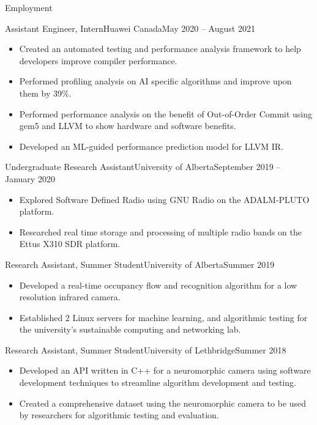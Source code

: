 \documentclass[]{mcdowellcv}
\begin{document}
\begin{cvsection}{Employment}
   \begin{cvsubsection}{Assistant Engineer, Intern}{Huawei Canada}{May 2020 -- August 2021}
    \begin{itemize}
      \item Created an automated testing and performance analysis framework to help developers improve compiler performance.
      \item Performed profiling analysis on AI specific algorithms and improve upon them by 39\%.
      \item Performed performance analysis on the benefit of Out-of-Order Commit using gem5 and LLVM to show hardware and software benefits.
      \item Developed an ML-guided performance prediction model for LLVM IR.
    \end{itemize}

  \end{cvsubsection}
  
  \begin{cvsubsection}{Undergraduate Research Assistant}{University of Alberta}{September 2019 -- January 2020}
    \vspace*{5pt}
    \begin{itemize}
      \item Explored Software Defined Radio using GNU Radio on the ADALM-PLUTO platform.
      \item Researched real time storage and processing of multiple radio bands on the Ettus X310 SDR platform.
    \end{itemize}

  \end{cvsubsection}
  \begin{cvsubsection}{Research Assistant, Summer Student}{University of Alberta}{Summer 2019}
    \vspace*{5pt}		
    \begin{itemize}
      \item Developed a real-time occupancy flow and recognition algorithm for a low resolution infrared camera.
      \item Established 2 Linux servers for machine learning, and algorithmic testing for the university's sustainable computing and networking lab.
    \end{itemize}
  \end{cvsubsection}
  \begin{cvsubsection}{Research Assistant, Summer Student}{University of Lethbridge}{Summer 2018}	
    \vspace*{5pt}
    \begin{itemize}
      \item Developed an API written in C++ for a neuromorphic camera using software development techniques to streamline algorithm development and testing.
      \item Created a comprehensive dataset using the neuromorphic camera to be used by researchers for algorithmic testing and evaluation.
    \end{itemize}
  \end{cvsubsection}
\end{cvsection}
\end{document}
